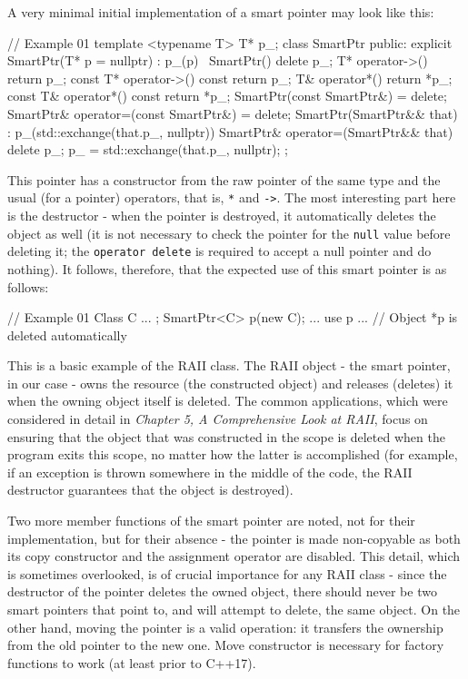 A very minimal initial implementation of a smart pointer may look like this:

\begin{code}
// Example 01
template <typename T>
  T* p_;
  class SmartPtr {
  public:
  explicit SmartPtr(T* p = nullptr) : p_(p) {}
  ~SmartPtr() {
    delete p_;
  }
  T* operator->() { return p_; }
  const T* operator->() const { return p_; }
  T& operator*() { return *p_; }
  const T& operator*() const { return *p_; }
  SmartPtr(const SmartPtr&) = delete;
  SmartPtr& operator=(const SmartPtr&) = delete;
  SmartPtr(SmartPtr&& that) :
    p_(std::exchange(that.p_, nullptr)) {}
  SmartPtr& operator=(SmartPtr&& that) {
    delete p_;
    p_ = std::exchange(that.p_, nullptr);
  }
};
\end{code}

This pointer has a constructor from the raw pointer of the same type and the usual (for a pointer) operators, that is, \texttt{*} and \texttt{-\textgreater{}}. The most interesting part here is the destructor - when the pointer is destroyed, it automatically deletes the object as well (it is not necessary to check the pointer for the \texttt{null} value before deleting it; the \texttt{operator\ delete} is required to accept a null pointer and do nothing). It follows, therefore, that the expected use of this smart pointer is as follows:

\begin{code}
// Example 01
Class C { ... };
{
  SmartPtr<C> p(new C);
  ... use p ...
} // Object *p is deleted automatically
\end{code}

This is a basic example of the RAII class. The RAII object - the smart pointer, in our case - owns the resource (the constructed object) and releases (deletes) it when the owning object itself is deleted. The common applications, which were considered in detail in \emph{Chapter 5, A Comprehensive Look at RAII}, focus on ensuring that the object that was constructed in the scope is deleted when the program exits this scope, no matter how the latter is accomplished (for example, if an exception is thrown somewhere in the middle of the code, the RAII destructor guarantees that the object is destroyed).

Two more member functions of the smart pointer are noted, not for their implementation, but for their absence - the pointer is made non-copyable as both its copy constructor and the assignment operator are disabled. This detail, which is sometimes overlooked, is of crucial importance for any RAII class - since the destructor of the pointer deletes the owned object, there should never be two smart pointers that point to, and will attempt to delete, the same object. On the other hand, moving the pointer is a valid operation: it transfers the ownership from the old pointer to the new one. Move constructor is necessary for factory functions to work (at least prior to C++17).

